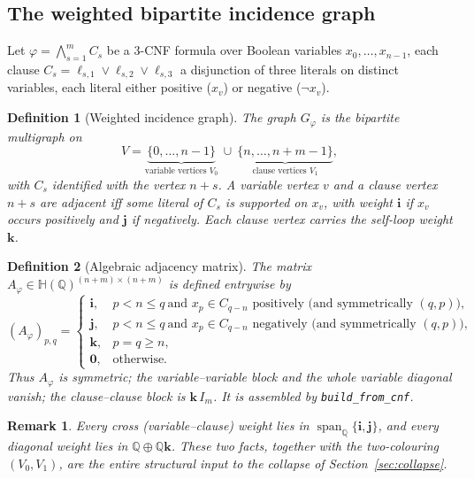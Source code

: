 \documentclass[pdflatex,sn-mathphys-num]{sn-jnl}
\theoremstyle{thmstyleone}%
\theoremstyle{thmstyletwo}%
\newtheorem{remark}{Remark}%
\theoremstyle{thmstylethree}%
\newtheorem{definition}{Definition}%
\newcommand{\HH}{\mathbb{H}}
\newcommand{\QQ}{\mathbb{Q}}
\newcommand{\bi}{\mathbf{i}}
\newcommand{\bj}{\mathbf{j}}
\newcommand{\bk}{\mathbf{k}}
\newcommand{\Aphi}{A_{\varphi}}
\newcommand{\Gphi}{G_{\varphi}}
\DeclareMathOperator{\spann}{span}
\begin{document}
\subsection{The weighted bipartite incidence graph}

Let $\varphi=\bigwedge_{s=1}^{m}C_s$ be a $3$-CNF formula over Boolean
variables $x_0,\dots,x_{n-1}$, each clause
$C_s=\ell_{s,1}\vee\ell_{s,2}\vee\ell_{s,3}$ a disjunction of three
literals on distinct variables, each literal either positive ($x_v$) or
negative ($\lnot x_v$).

\begin{definition}[Weighted incidence graph]\label{def:graph}
The graph $\Gphi$ is the bipartite multigraph on
\[
  V=\underbrace{\{0,\dots,n-1\}}_{\text{variable vertices }V_0}
   \ \cup\
   \underbrace{\{n,\dots,n+m-1\}}_{\text{clause vertices }V_1},
\]
with $C_s$ identified with the vertex $n+s$. A variable vertex $v$ and a
clause vertex $n+s$ are adjacent iff some literal of $C_s$ is supported on
$x_v$, with weight $\bi$ if $x_v$ occurs positively and $\bj$ if
negatively. Each clause vertex carries the self-loop weight $\bk$.
\end{definition}

\begin{definition}[Algebraic adjacency matrix]\label{def:matrix}
The matrix $\Aphi\in\HH(\QQ)^{(n+m)\times(n+m)}$ is defined entrywise by
\[
  (\Aphi)_{p,q}=
  \begin{cases}
    \bi, & p<n\le q\ \text{and }x_p\in C_{q-n}\text{ positively (and symmetrically }(q,p)),\\
    \bj, & p<n\le q\ \text{and }x_p\in C_{q-n}\text{ negatively (and symmetrically }(q,p)),\\
    \bk, & p=q\ge n,\\
    \mathbf 0, & \text{otherwise.}
  \end{cases}
\]
Thus $\Aphi$ is symmetric; the variable--variable block and the whole
variable diagonal vanish; the clause--clause block is $\bk\,I_m$. It is
assembled by \texttt{build\_from\_cnf}.
\end{definition}

\begin{remark}\label{rem:cross}
Every cross (variable--clause) weight lies in
$\spann_\QQ\{\bi,\bj\}$, and every diagonal weight lies in
$\QQ\oplus\QQ\bk$. These two facts, together with the two-colouring
$(V_0,V_1)$, are the entire structural input to the collapse of
Section~\ref{sec:collapse}.
\end{remark}
\end{document}
